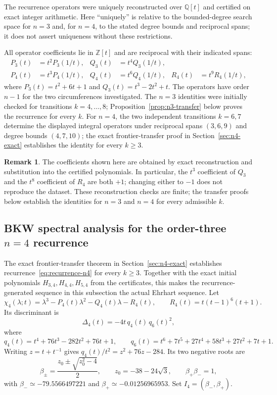 \documentclass[11pt,a4paper]{article}
\theoremstyle{definition}
\newtheorem{remark}[theorem]{Remark}
\begin{document}
The recurrence operators were uniquely reconstructed over
$\mathbb{Q}[t]$ and certified on exact integer arithmetic. Here
``uniquely'' is relative to the bounded-degree search space for $n=3$
and, for $n=4$, to the stated degree bounds and reciprocal spans; it does
not assert uniqueness without these restrictions.

All operator coefficients lie in $\mathbb{Z}[t]$ and are reciprocal with
their indicated spans:
\[
\begin{aligned}
P_3(t)&=t^2P_3(1/t),&
Q_3(t)&=t^4Q_3(1/t),\\
P_4(t)&=t^3P_4(1/t),&
Q_4(t)&=t^6Q_4(1/t),&
R_4(t)&=t^9R_4(1/t),
\end{aligned}
\]
where $P_3(t)=t^2+6t+1$ and $Q_3(t)=t^3-2t^2+t$. The operators have order $n-1$ for the two circumferences investigated.
The $n=3$ identities were initially
checked for transitions $k=4,\ldots,8$; Proposition~\ref{prop:n3-transfer}
below proves the recurrence for every $k$. For $n=4$, the two independent
transitions $k=6,7$ determine the displayed integral operators under
reciprocal spans $(3,6,9)$ and degree bounds $(4,7,10)$; the exact
frontier-transfer proof in Section~\ref{sec:n4-exact} establishes the
identity for every $k\ge3$.

\begin{remark}
The coefficients shown here are obtained by exact reconstruction and
substitution into the certified polynomials. In particular, the
$t^3$ coefficient of $Q_3$ and the $t^8$ coefficient of $R_4$ are both
$+1$; changing either to $-1$ does not reproduce the dataset. These
reconstruction checks are finite; the transfer proofs below establish
the identities for $n=3$ and $n=4$ for every admissible $k$.
\end{remark}

\subsection[BKW spectral analysis for n=4]{BKW spectral analysis for the order-three $n=4$ recurrence}
\label{sec:n4-bkw}

The exact frontier-transfer theorem in Section~\ref{sec:n4-exact}
establishes recurrence~\eqref{eq:recurrence-n4} for every $k\ge3$.
Together with the exact initial polynomials
$H_{3,4},H_{4,4},H_{5,4}$ from the certificates, this makes the
recurrence-generated sequence in this subsection the actual Ehrhart
sequence.
Let
\[
\chi_4(\lambda;t)=\lambda^3-P_4(t)\lambda^2-Q_4(t)\lambda-R_4(t),
\qquad R_4(t)=t(t-1)^6(t+1).
\]
Its discriminant is
\[
\Delta_4(t)=-4t\,q_4(t)\,q_6(t)^2,
\]
where
\[
q_4(t)=t^4+76t^3-282t^2+76t+1,\qquad
q_6(t)=t^6+7t^5+27t^4+58t^3+27t^2+7t+1.
\]
Writing $z=t+t^{-1}$ gives $q_4(t)/t^2=z^2+76z-284$. Its two
negative roots are
\[
\beta_\pm=\frac{z_0\pm\sqrt{z_0^2-4}}2,\qquad
z_0=-38-24\sqrt3,\qquad \beta_+\beta_-=1,
\]
with $\beta_-\simeq-79.5566497221$ and
$\beta_+\simeq-0.01256965953$. Set
$I_4=(\beta_-,\beta_+)$.
\end{document}
